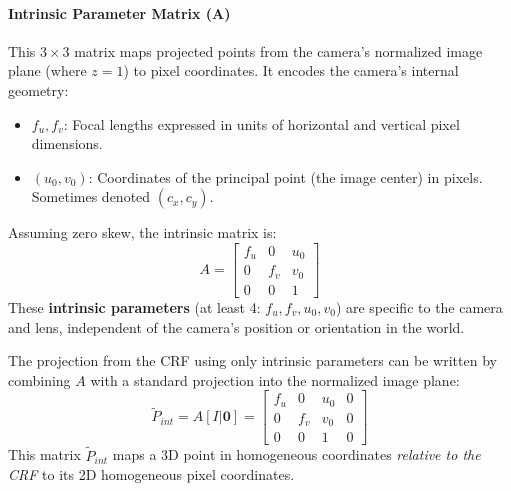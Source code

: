 \paragraph{Intrinsic Parameter Matrix (A)}
This $3 \times 3$ matrix maps projected points from the camera's normalized image plane (where $z=1$) to pixel coordinates. It encodes the camera's internal geometry:
\begin{itemize}
    \item $f_u, f_v$: Focal lengths expressed in units of horizontal and vertical pixel dimensions.
    \item $(u_0, v_0)$: Coordinates of the principal point (the image center) in pixels. Sometimes denoted $(c_x, c_y)$.
\end{itemize}
Assuming zero skew, the intrinsic matrix is:
\[
A =
\begin{bmatrix}
  f_u & 0 & u_0 \\
  0 & f_v & v_0 \\
  0 & 0 & 1
\end{bmatrix}
\]
These \textbf{intrinsic parameters} (at least 4: $f_u, f_v, u_0, v_0$) are specific to the camera and lens, independent of the camera's position or orientation in the world.

The projection from the CRF using only intrinsic parameters can be written by combining $A$ with a standard projection into the normalized image plane:
\[
\tilde{P}_{int} = A [I | \mathbf{0}] =
\begin{bmatrix}
  f_u & 0 & u_0 & 0 \\
  0 & f_v & v_0 & 0 \\
  0 & 0 & 1 & 0
\end{bmatrix}
\]
This matrix $\tilde{P}_{int}$ maps a 3D point in homogeneous coordinates \emph{relative to the CRF} to its 2D homogeneous pixel coordinates.

